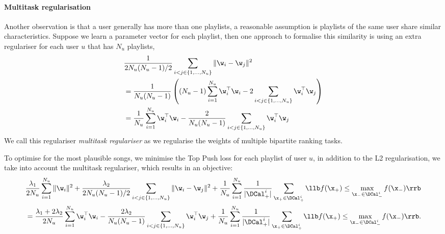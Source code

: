 \paragraph{Multitask regularisation}
Another observation is that a user generally has more than one playlists,
a reasonable assumption is playlists of the same user share similar characteristics. 
Suppose we learn a parameter vector for each playlist, then one approach to formalise this similarity is using an extra regulariser
for each user $u$ that has $N_u$ playlists,
\begin{equation}
\label{eq:mtreg}
\begin{aligned}
&\frac{1}{2 N_u (N_u - 1) / 2} \sum_{i < j \in \{1,\dots,N_u\}} \| \w_i - \w_j \|^2 \\
&= \frac{1}{N_u (N_u - 1)} \left( (N_u - 1) \sum_{i=1}^{N_u} \w_i^\top \w_i - 2 \sum_{i < j \in \{1,\dots,N_u\}} \w_i^\top \w_j \right) \\
&= \frac{1}{N_u} \sum_{i=1}^{N_u} \w_i^\top \w_i - \frac{2}{N_u (N_u - 1)} \sum_{i < j \in \{1,\dots,N_u\}} \w_i^\top \w_j %
\end{aligned}
\end{equation}
We call this regulariser \emph{multitask regulariser} as we regularise the weights of multiple bipartite ranking tasks. 

To optimise for the most plausible songs, we minimise the Top Push loss for each playlist of user $u$, 
in addition to the L2 regularisation, we take into account the multitask regulariser, which results in an objective:
\begin{equation}
\label{eq:mtobj}
\begin{aligned}
&\frac{\lambda_1}{2 N_u} \sum_{i=1}^{N_u} \| \w_i \|^2
+ \frac{\lambda_2}{2 N_u (N_u - 1) / 2} \sum_{i < j \in \{1,\dots,N_u\}} \| \w_i - \w_j \|^2 
+ \frac{1}{N_u} \sum_{i = 1}^{N_u} \frac{1}{|\DCal_+^i|} \sum_{\x_+ \in \DCal_+^i} \llb f(\x_+) \le \max_{\x_- \in \DCal_-^i} f(\x_-) \rrb \\
&= \frac{\lambda_1 + 2\lambda_2}{2 N_u} \sum_{i=1}^{N_u} \w_i^\top \w_i 
- \frac{2\lambda_2}{N_u (N_u - 1)} \sum_{i < j \in \{1,\dots,N_u\}} \w_i^\top \w_j
+ \frac{1}{N_u} \sum_{i = 1}^{N_u} \frac{1}{|\DCal_+^i|} \sum_{\x_+ \in \DCal_+^i} \llb f(\x_+) \le \max_{\x_- \in \DCal_-^i} f(\x_-) \rrb.
\end{aligned}
\end{equation}

